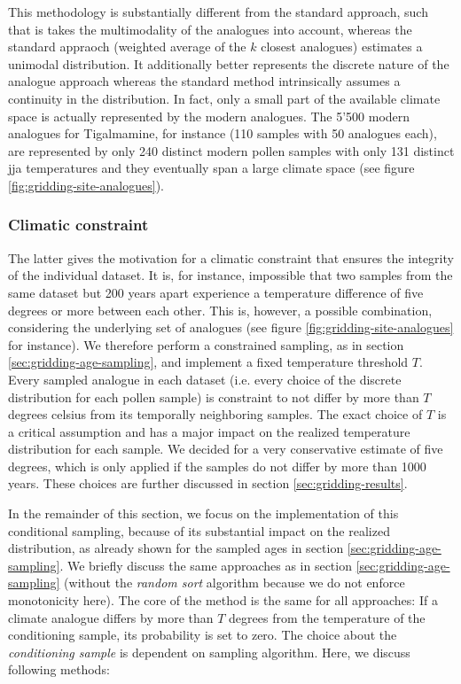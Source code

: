 \begin{refsection}
This methodology is substantially different from the standard approach, such that is takes the multimodality of the analogues into account, whereas the standard appraoch (weighted average of the $k$ closest analogues) estimates a unimodal distribution. It additionally better represents the discrete nature of the analogue approach whereas the standard method intrinsically assumes a continuity in the distribution. In fact, only a small part of the available climate space is actually represented by the modern analogues. The 5'500 modern analogues for Tigalmamine, for instance (110 samples with 50 analogues each), are represented by only 240 distinct modern pollen samples with only 131 distinct \gls{jja} temperatures and they eventually span a large climate space (see figure \ref{fig:gridding-site-analogues}).

\subsubsection{Climatic constraint}
The latter gives the motivation for a climatic constraint that ensures the integrity of the individual dataset. It is, for instance, impossible that two samples from the same dataset but 200 years apart experience a temperature difference of five degrees or more between each other. This is, however, a possible combination, considering the underlying set of analogues (see figure \ref{fig:gridding-site-analogues} for instance). We therefore perform a constrained sampling, as in section \ref{sec:gridding-age-sampling}, and implement a fixed temperature threshold $T$. Every sampled analogue in each dataset (i.e. every choice of the discrete distribution for each pollen sample) is constraint to not differ by more than $T$ degrees celsius from its temporally neighboring samples. The exact choice of $T$ is a critical assumption and has a major impact on the realized temperature distribution for each sample. We decided for a very conservative estimate of five degrees, which is only applied if the samples do not differ by more than 1000 years. These choices are further discussed in section \ref{sec:gridding-results}.

In the remainder of this section, we focus on the implementation of this conditional sampling, because of its substantial impact on the realized distribution, as already shown for the sampled ages in section \ref{sec:gridding-age-sampling}. We briefly discuss the same approaches as in section \ref{sec:gridding-age-sampling} (without the \textit{random sort} algorithm because we do not enforce monotonicity here). The core of the method is the same for all approaches: If a climate analogue differs by more than $T$ degrees from the temperature of the conditioning sample, its probability is set to zero. The choice about the \textit{conditioning sample} is dependent on sampling algorithm. Here, we discuss following methods:


\end{refsection}
